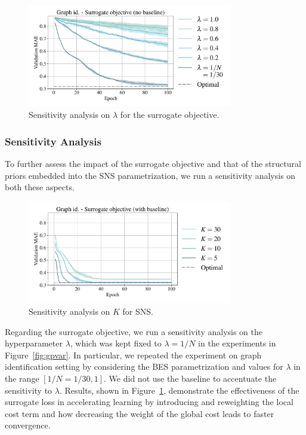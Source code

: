 \begin{figure}[t]
    \centering
    \includegraphics[width=0.8\textwidth]{imgs/lam.pdf}
    \caption{Sensitivity analysis on $\lambda$ for the surrogate objective.}
    \label{fig:lam}
\end{figure}

\subsubsection{Sensitivity Analysis}

To further assess the impact of the surrogate objective and that of the structural priors embedded into the SNS parametrization, we run a sensitivity analysis on both these aspects.

\begin{figure}[t]
    \centering
    \includegraphics[width=0.8\textwidth]{imgs/ks.pdf}
    \caption{Sensitivity analysis on $K$ for SNS.}
    \label{fig:ks}
\end{figure}

Regarding the surrogate objective, we run a sensitivity analysis on the hyperparameter $\lambda$, which was kept fixed to $\lambda=1/N$ in the experiments in Figure~\ref{fig:gpvar}. In particular, we repeated the experiment on graph identification setting by considering the BES parametrization and values for $\lambda$ in the range $[1/N=1/30, 1]$. We did not use the baseline to accentuate the sensitivity to $\lambda$. Results, shown in Figure~\ref{fig:lam}, demonstrate the effectiveness of the surrogate loss in accelerating learning by introducing and reweighting the local cost term and how decreasing the weight of the global cost leads to faster convergence. 

